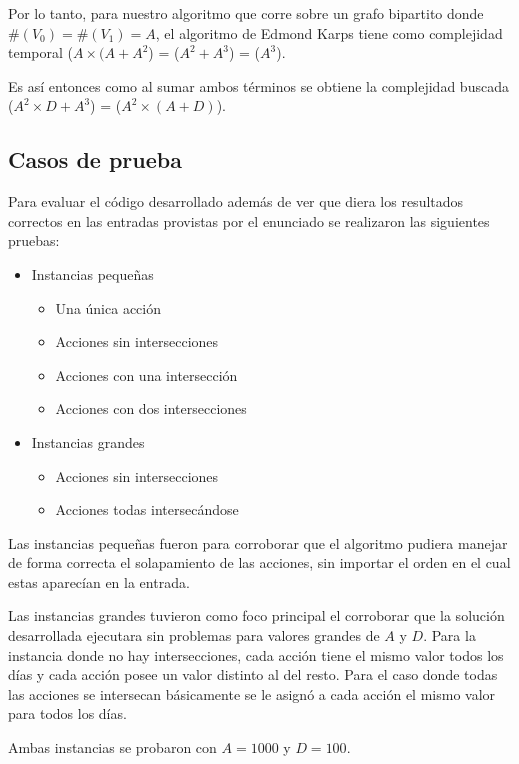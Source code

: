 Por lo tanto, para nuestro algoritmo que corre sobre un grafo bipartito donde
$\#(V_0) = \#(V_1) = A$, el algoritmo de Edmond Karps tiene como complejidad
temporal \ord($A \times (A + A^2$) = \ord($A^2 + A^3$) = \ord($A^3$).

Es así entonces como al sumar ambos términos se obtiene la complejidad buscada \ord($A^2 \times D +
A^3$) = \ord($A^2 \times (A + D)$).

\subsection{Casos de prueba}

Para evaluar el código desarrollado además de ver que diera los resultados
correctos en las entradas provistas por el enunciado se realizaron las
siguientes pruebas:

\begin{itemize}
	\item{Instancias pequeñas
		\begin{itemize}
			\item{Una única acción}
			\item{Acciones sin intersecciones}
			\item{Acciones con una intersección}
			\item{Acciones con dos intersecciones}
		\end{itemize}
	}
	\item{Instancias grandes
		\begin{itemize}
			\item{Acciones sin intersecciones}
			\item{Acciones todas intersecándose}
		\end{itemize}
	}
\end{itemize}

Las instancias pequeñas fueron para corroborar que el algoritmo pudiera manejar
de forma correcta el solapamiento de las acciones, sin importar el orden en el
cual estas aparecían en la entrada.

Las instancias grandes tuvieron como foco principal el corroborar que la
solución desarrollada ejecutara sin problemas para valores grandes de $A$ y $D$.
Para la instancia donde no hay intersecciones, cada acción tiene el mismo valor
todos los días y cada acción posee un valor distinto al del resto. Para el caso
donde todas las acciones se intersecan básicamente se le asignó a cada acción el
mismo valor para todos los días.

Ambas instancias se probaron con $A = 1000$ y $D = 100$.
